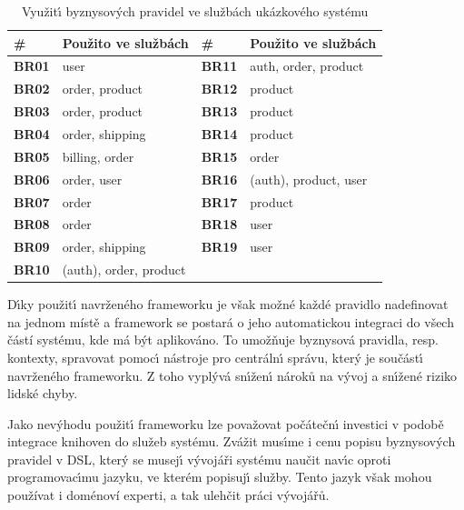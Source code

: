 \begin{table}
    \centering
    \begin{tabularx}{\textwidth}{ l X | l X }
        \hline
        \textbf{\#} & \textbf{Použito ve službách} & \textbf{\#} & \textbf{Použito ve službách} \\ \hline \hline
        \textbf{BR01} & user & \textbf{BR11} & auth, order, product \\
        \textbf{BR02} & order, product & \textbf{BR12} & product \\
        \textbf{BR03} & order, product & \textbf{BR13} & product \\
        \textbf{BR04} & order, shipping & \textbf{BR14} & product \\
        \textbf{BR05} & billing, order & \textbf{BR15} & order \\
        \textbf{BR06} & order, user & \textbf{BR16} & (auth), product, user \\
        \textbf{BR07} & order & \textbf{BR17} & product \\
        \textbf{BR08} & order & \textbf{BR18} & user \\
        \textbf{BR09} & order, shipping & \textbf{BR19} & user \\
        \textbf{BR10} & (auth), order, product & \\
        \hline
    \end{tabularx}
    \caption{Využit\'{\i} byznysov\'ych pravidel ve službách ukázkového systému}
    \label{tbl:duplication}
\end{table}

D\'{\i}ky použit\'{\i} navrženého frameworku je však možné každé pravidlo nadefinovat na jednom místě
a framework se postará o jeho automatickou integraci do všech částí systému, kde má být aplikováno.
To umožňuje byznysová pravidla, resp. kontexty, spravovat pomoc\'{\i} nástroje pro
centráln\'{\i} správu, kter\'y je součást\'{\i} navrženého frameworku. Z toho vypl\'yvá
sn\'{\i}žen\'{\i} nároků na v\'yvoj a sn\'{\i}žené riziko lidské chyby.

Jako nev\'yhodu použit\'{\i} frameworku lze považovat počátečn\'{\i} investici v podobě integrace knihoven do služeb systému.
Zvážit mus\'{\i}me i cenu popisu byznysov\'ych pravidel v \gls{DSL}, kter\'y se musej\'{\i} v\'yvojáři systému naučit nav\'{\i}c
oproti programovac\'{\i}mu jazyku, ve kterém popisuj\'{\i} služby. Tento jazyk však mohou používat i doménoví experti, a tak
ulehčit práci vývojářů.

